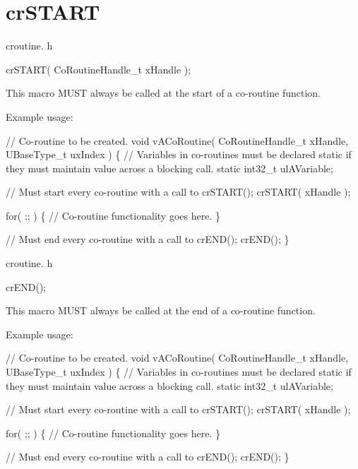 \hypertarget{group__cr_s_t_a_r_t}{}\section{cr\+S\+T\+A\+RT}
\label{group__cr_s_t_a_r_t}
croutine. h 
\begin{DoxyPre}
crSTART( CoRoutineHandle\_t xHandle );\end{DoxyPre}


This macro M\+U\+ST always be called at the start of a co-\/routine function.

Example usage\+: 
\begin{DoxyPre}
// Co-routine to be created.
void vACoRoutine( CoRoutineHandle\_t xHandle, UBaseType\_t uxIndex )
\{
// Variables in co-routines must be declared static if they must maintain value across a blocking call.
static int32\_t ulAVariable;\end{DoxyPre}



\begin{DoxyPre}    // Must start every co-routine with a call to crSTART();
    crSTART( xHandle );\end{DoxyPre}



\begin{DoxyPre}    for( ;; )
    \{
         // Co-routine functionality goes here.
    \}\end{DoxyPre}



\begin{DoxyPre}    // Must end every co-routine with a call to crEND();
    crEND();
\}\end{DoxyPre}


croutine. h 
\begin{DoxyPre}
crEND();\end{DoxyPre}


This macro M\+U\+ST always be called at the end of a co-\/routine function.

Example usage\+: 
\begin{DoxyPre}
// Co-routine to be created.
void vACoRoutine( CoRoutineHandle\_t xHandle, UBaseType\_t uxIndex )
\{
// Variables in co-routines must be declared static if they must maintain value across a blocking call.
static int32\_t ulAVariable;\end{DoxyPre}



\begin{DoxyPre}    // Must start every co-routine with a call to crSTART();
    crSTART( xHandle );\end{DoxyPre}



\begin{DoxyPre}    for( ;; )
    \{
         // Co-routine functionality goes here.
    \}\end{DoxyPre}



\begin{DoxyPre}    // Must end every co-routine with a call to crEND();
    crEND();
\}\end{DoxyPre}
 